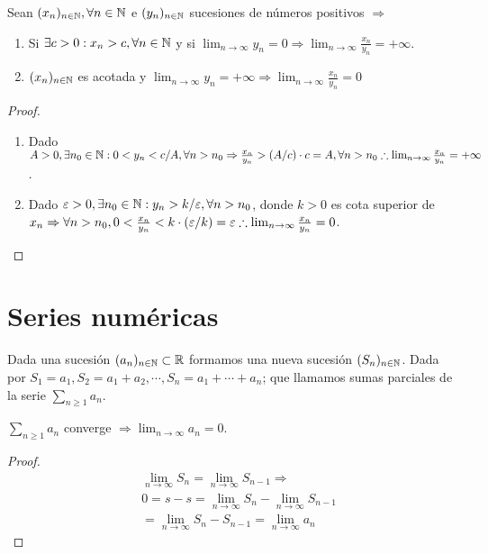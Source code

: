 \begin{prop}
  Sean \((x_n)_{n \in \mathbb{N}}, \forall n \in \mathbb{N}\) e \((y_n)_{n \in \mathbb{N}}\) sucesiones de números positivos \(\Rightarrow\) \begin{enumerate}
    \item Si \(\exists c > 0 : x_n > c, \forall n \in \mathbb{N}\) y si \(\lim_{n \to \infty} y_n = 0 \Rightarrow \lim_{n \to \infty} \frac{x_n}{y_n} = +\infty\).
    \item \((x_n)_{n \in \mathbb{N}}\) es acotada y \(\lim_{n \to \infty} y_n = +\infty \Rightarrow \lim_{n \to \infty} \frac{x_n}{y_n} = 0\)
  \end{enumerate}
  \begin{proof}
    \begin{enumerate}
      \item Dado \(A > 0, \exists n_0 \in \mathbb{N} : 0 < y_n < c/A, \forall n > n_0 \Rightarrow \frac{x_n}{y_n} > (A/c) \cdot c = A, \forall n > n_0 \therefore \lim_{n \to \infty} \frac{x_n}{y_n} = + \infty\).
      \item Dado \(\varepsilon > 0, \exists n_0 \in \mathbb{N} : y_n > k/\varepsilon, \forall n > n_0\), donde \(k > 0\) es cota superior de \(x_n \Rightarrow \forall n > n_0, 0 < \frac{x_n}{y_n} < k \cdot (\varepsilon/k) = \varepsilon \therefore \lim_{n \to \infty} \frac{x_n}{y_n} = 0\).
    \end{enumerate}
  \end{proof}
\end{prop}

\section{Series numéricas}

Dada una sucesión \((a_n)_{n \in \mathbb{N}} \subset \mathbb{R}\) formamos una nueva sucesión \((S_n)_{n \in \mathbb{N}}\). Dada por \(S_1 = a_1, S_2 = a_1 + a_2, \cdots, S_n = a_1 + \cdots + a_n\); que llamamos sumas parciales de la serie \(\sum_{n \geq 1} a_n\).

\begin{theorem}
  \(\sum_{n \geq 1} a_n\) converge \(\Rightarrow \lim_{n \to \infty} a_n = 0\).
  \begin{proof}
    \begin{align*}
       & \lim_{n \to \infty} S_n = \lim_{n \to \infty} S_{n-1} \Rightarrow \\
       & 0 = s - s = \lim_{n \to \infty} S_n - \lim_{n \to \infty} S_{n-1} \\
       & = \lim_{n \to \infty} S_n - S_{n-1} = \lim_{n \to \infty} a_n
    \end{align*}
  \end{proof}
\end{theorem}

